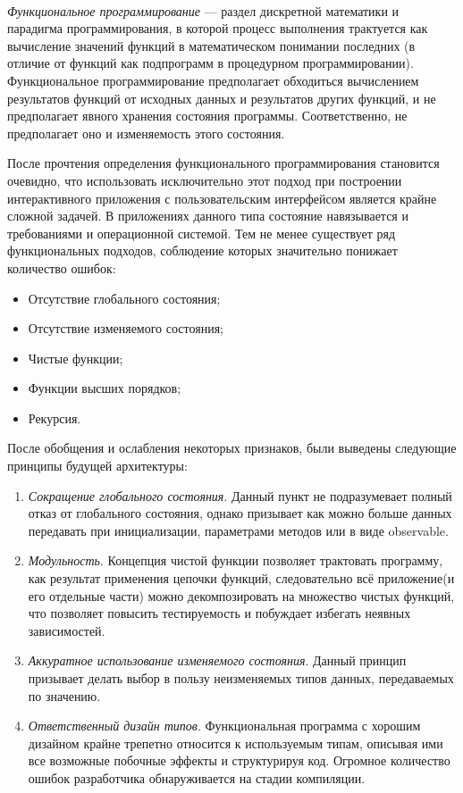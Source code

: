\paragraph{}
\emph{Функциональное программирование} --- раздел дискретной математики и парадигма программирования, в которой процесс выполнения трактуется как вычисление значений функций в математическом понимании последних (в отличие от функций как подпрограмм в процедурном программировании). Функциональное программирование предполагает обходиться вычислением результатов функций от исходных данных и результатов других функций, и не предполагает явного хранения состояния программы. Соответственно, не предполагает оно и изменяемость этого состояния. \cite{wiki:fp}

После прочтения определения функционального программирования становится очевидно, что использовать исключительно этот подход при построении интерактивного приложения с пользовательским интерфейсом является крайне сложной задачей. В приложениях данного типа состояние навязывается и требованиями и операционной системой. Тем не менее существует ряд функциональных подходов, соблюдение которых значительно понижает количество ошибок:

\begin{itemize}
\item Отсутствие глобального состояния;
\item Отсутствие изменяемого состояния;
\item Чистые функции;
\item Функции высших порядков;
\item Рекурсия.
\end{itemize}

После обобщения и ослабления некоторых признаков, были выведены следующие принципы будущей архитектуры:

\begin{enumerate}
\item \emph{Сокращение глобального состояния}. Данный пункт не подразумевает полный отказ от глобального состояния, однако призывает как можно больше данных передавать при инициализации, параметрами методов или в виде \gls{observable}.
\item \emph{Модульность}. Концепция чистой функции позволяет трактовать программу, как результат применения цепочки функций, следовательно всё приложение(и его отдельные части) можно декомпозировать на множество чистых функций, что позволяет повысить тестируемость и побуждает избегать неявных зависимостей.
\item \emph {Аккуратное использование изменяемого состояния}. Данный принцип призывает делать выбор в пользу неизменяемых типов данных, передаваемых по значению. 
\item \emph {Ответственный дизайн типов}. Функциональная программа с хорошим дизайном крайне трепетно относится к используемым типам, описывая ими все возможные побочные эффекты и структурируя код. Огромное количество ошибок разработчика обнаруживается на стадии компиляции.
\end{enumerate}

